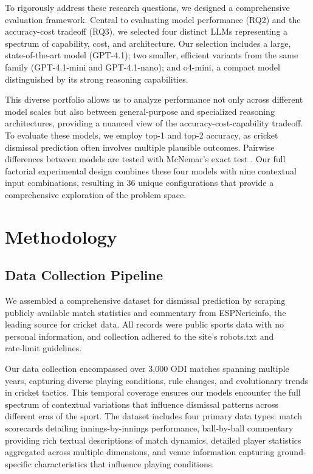 \documentclass[sigconf,anonymous,review]{acmart}
\begin{document}
To rigorously address these research questions, we designed a comprehensive evaluation framework. Central to evaluating model performance (RQ2) and the accuracy-cost tradeoff (RQ3), we selected four distinct LLMs representing a spectrum of capability, cost, and architecture. Our selection includes a large, state-of-the-art model (GPT-4.1); two smaller, efficient variants from the same family (GPT-4.1-mini and GPT-4.1-nano); and o4-mini, a compact model distinguished by its strong reasoning capabilities.

This diverse portfolio allows us to analyze performance not only across different model scales but also between general-purpose and specialized reasoning architectures, providing a nuanced view of the accuracy-cost-capability tradeoff. To evaluate these models, we employ top-1 and top-2 accuracy, as cricket dismissal prediction often involves multiple plausible outcomes. Pairwise differences between models are tested with McNemar’s exact test \cite{mcnemar_significance_testing}. Our full factorial experimental design combines these four models with nine contextual input combinations, resulting in 36 unique configurations that provide a comprehensive exploration of the problem space.


\section{Methodology}

\subsection{Data Collection Pipeline}
\label{sec:data-collection}

We assembled a comprehensive dataset for dismissal prediction by scraping publicly available match statistics and commentary from ESPNcricinfo, the leading source for cricket data. All records were public sports data with no personal information, and collection adhered to the site’s robots.txt and rate‑limit guidelines.

Our data collection encompassed over 3,000 ODI matches spanning multiple years, capturing diverse playing conditions, rule changes, and evolutionary trends in cricket tactics. This temporal coverage ensures our models encounter the full spectrum of contextual variations that influence dismissal patterns across different eras of the sport. The dataset includes four primary data types: match scorecards detailing innings-by-innings performance, ball-by-ball commentary providing rich textual descriptions of match dynamics, detailed player statistics aggregated across multiple dimensions, and venue information capturing ground-specific characteristics that influence playing conditions.
\end{document}
